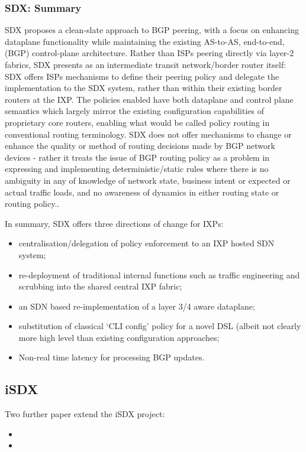 \subsubsection{SDX: Summary}
SDX proposes a clean-slate approach to BGP peering, with a focus on enhancing dataplane functionality while maintaining the existing AS-to-AS, end-to-end, (BGP) control-plane architecture.
Rather than ISPs peering directly via layer-2 fabrics, SDX presents as an intermediate transit network/border router itself: SDX offers ISPs mechanisms to define their peering policy and delegate the implementation to the SDX system, rather than within their existing border routers at the IXP.
The policies enabled have both dataplane and control plane semantics which largely mirror the existing configuration capabilities of proprietary core routers, enabling what would be called policy routing in conventional routing terminology.
SDX does not offer mechanisms to change or enhance the quality or method of routing decisions made by BGP network devices - rather it treats the issue of BGP routing policy as a problem in expressing and implementing deterministic/static rules where there is no ambiguity in any of knowledge of network state, business intent or expected or actual traffic loads, and no awareness of dynamics in either routing state or routing policy..

In summary, SDX offers three directions of change for IXPs:
\begin{itemize}[noitemsep,nolistsep]
	\item{centralisation/delegation of policy enforcement to an IXP hosted SDN system;}
	\item{re-deployment of traditional internal functions such as traffic engineering and scrubbing into the shared central IXP fabric;}
	\item{an SDN based re-implementation of a layer 3/4 aware dataplane;}
	\item{substitution of classical `CLI config' policy for a novel DSL (albeit not clearly more high level than existing configuration approaches;}
	\item{Non-real time latency for processing BGP updates.}
\end{itemize}
\subsection{iSDX}
Two further paper extend the iSDX project:

\smallskip

\begin{itemize}[noitemsep,nolistsep]
	\item {}
	\item {}
\end{itemize}

